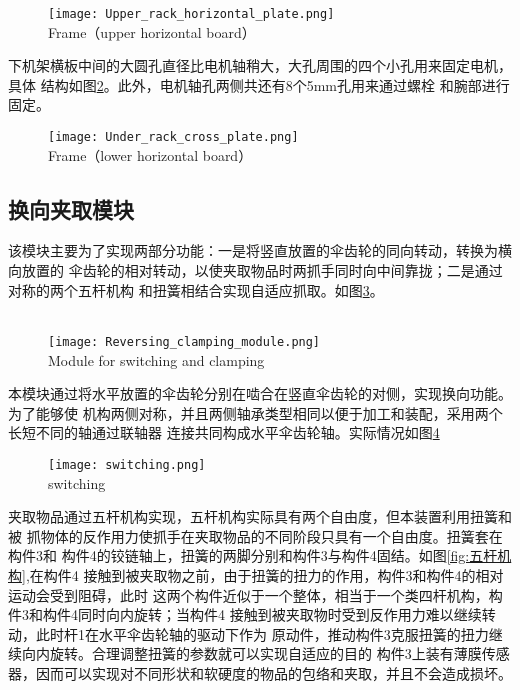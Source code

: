 \begin{figure}[!htp]
  \centering
  \texttt{[image: Upper\_rack\_horizontal\_plate.png]} \\
    {Frame（upper horizontal board）}
  \label{fig:上机架横板}
\end{figure}

下机架横板中间的大圆孔直径比电机轴稍大，大孔周围的四个小孔用来固定电机，具体
结构如图\ref{fig:下机架横板}。此外，电机轴孔两侧共还有8个5mm孔用来通过螺栓
和腕部进行固定。
\\

\begin{figure}[!htp]
  \centering
  \texttt{[image: Under\_rack\_cross\_plate.png]} \\
    {Frame（lower horizontal board）}
  \label{fig:下机架横板}
\end{figure}

\subsection{换向夹取模块}

该模块主要为了实现两部分功能：一是将竖直放置的伞齿轮的同向转动，转换为横向放置的
伞齿轮的相对转动，以使夹取物品时两抓手同时向中间靠拢；二是通过对称的两个五杆机构
和扭簧相结合实现自适应抓取。如图\ref{fig:换向夹取模块}。
\\
\\


\begin{figure}[!htp]
  \centering
  \texttt{[image: Reversing\_clamping\_module.png]} \\
    {Module for switching and clamping}
  \label{fig:换向夹取模块}
\end{figure}

本模块通过将水平放置的伞齿轮分别在啮合在竖直伞齿轮的对侧，实现换向功能。为了能够使
机构两侧对称，并且两侧轴承类型相同以便于加工和装配，采用两个长短不同的轴通过联轴器
连接共同构成水平伞齿轮轴。实际情况如图\ref{fig:switching}

\begin{figure}[!htp]
  \centering
  \texttt{[image: switching.png]} \\
    {switching}
  \label{fig:switching}
\end{figure}
夹取物品通过五杆机构实现，五杆机构实际具有两个自由度，但本装置利用扭簧和被
抓物体的反作用力使抓手在夹取物品的不同阶段只具有一个自由度。扭簧套在构件3和
构件4的铰链轴上，扭簧的两脚分别和构件3与构件4固结。如图\ref{fig:五杆机构},在构件4
接触到被夹取物之前，由于扭簧的扭力的作用，构件3和构件4的相对运动会受到阻碍，此时
这两个构件近似于一个整体，相当于一个类四杆机构，构件3和构件4同时向内旋转；当构件4
接触到被夹取物时受到反作用力难以继续转动，此时杆1在水平伞齿轮轴的驱动下作为
原动件，推动构件3克服扭簧的扭力继续向内旋转。合理调整扭簧的参数就可以实现自适应的目的
构件3上装有薄膜传感器，因而可以实现对不同形状和软硬度的物品的包络和夹取，并且不会造成损坏。

